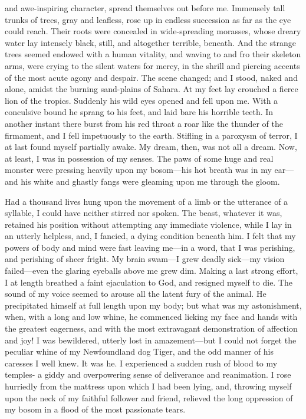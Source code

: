 and awe-inspiring character, spread themselves out before me. Immensely tall
trunks of trees, gray and leafless, rose up in endless succession as far as the
eye could reach. Their roots were concealed in wide-spreading morasses, whose
dreary water lay intensely black, still, and altogether terrible, beneath. And
the strange trees seemed endowed with a human vitality, and waving to and fro
their skeleton arms, were crying to the silent waters for mercy, in the shrill
and piercing accents of the most acute agony and despair. The scene changed; and
I stood, naked and alone, amidst the burning sand-plains of Sahara. At my feet
lay crouched a fierce lion of the tropics. Suddenly his wild eyes opened and
fell upon me. With a conculsive bound he sprang to his feet, and laid bare his
horrible teeth. In another instant there burst from his red throat a roar like
the thunder of the firmament, and I fell impetuously to the earth. Stifling in a
paroxysm of terror, I at last found myself partially awake. My dream, then, was
not all a dream. Now, at least, I was in possession of my senses. The paws of
some huge and real monster were pressing heavily upon my bosom---his hot breath
was in my ear---and his white and ghastly fangs were gleaming upon me through
the gloom. 

Had a thousand lives hung upon the movement of a limb or the utterance of a
syllable, I could have neither stirred nor spoken. The beast, whatever it was,
retained his position without attempting any immediate violence, while I lay in
an utterly helpless, and, I fancied, a dying condition beneath him. I felt that
my powers of body and mind were fast leaving me---in a word, that I was
perishing, and perishing of sheer fright. My brain swam---I grew deadly
sick---my vision failed---even the glaring eyeballs above me grew dim. Making a
last strong effort, I at length breathed a faint ejaculation to God, and
resigned myself to die. The sound of my voice seemed to arouse all the latent
fury of the animal. He precipitated himself at full length upon my body; but
what was my astonishment, when, with a long and low whine, he commenced licking
my face and hands with the greatest eagerness, and with the most extravagant
demonstration of affection and joy! I was bewildered, utterly lost in
amazement---but I could not forget the peculiar whine of my Newfoundland dog
Tiger, and the odd manner of his caresses I well knew. It was he. I experienced
a sudden rush of blood to my temples- a giddy and overpowering sense of
deliverance and reanimation. I rose hurriedly from the mattress upon which I had
been lying, and, throwing myself upon the neck of my faithful follower and
friend, relieved the long oppression of my bosom in a flood of the most
passionate tears. 

